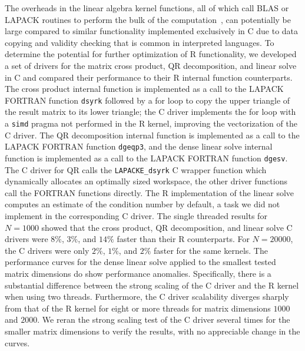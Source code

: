 The overheads in the linear algebra kernel functions, all of which call BLAS or LAPACK
routines to perform the bulk of the computation~\cite{cran:Rmanuals}, can potentially be
large compared to similar functionality implemented exclusively in C due to data copying
and validity checking that is common in interpreted languages. To determine the potential
for further optimization of R functionality, we developed a set of drivers for the matrix
cross product, QR decomposition, and linear solve in C and compared their performance to
their R internal function counterparts. The cross product internal function is
implemented as a call to the LAPACK FORTRAN function \texttt{dsyrk} followed by a for loop
to copy the upper triangle of the result matrix to its lower triangle; the C driver
implements the for loop with a \texttt{simd} pragma not performed in the R kernel, improving
the vectorization of the C driver. The QR decomposition internal function is implemented as a call
to the LAPACK FORTRAN function \texttt{dgeqp3}, and the dense linear solve internal
function is implemented as a call to the LAPACK FORTRAN function \texttt{dgesv}. The C
driver for QR calls the \texttt{LAPACKE\_dsyrk} C wrapper function which dynamically
allocates an optimally sized workspace, the other driver functions call the FORTRAN
functions directly. The R implementation of the linear solve computes an estimate of the
condition number by default, a task we did not implement in the corresponding C driver.
The single threaded results for $N=1000$ showed that the cross product,
QR decomposition, and linear solve C drivers were $8\%$, $3\%$, and $14\%$ faster than their
R counterparts.  For $N=20000$, the C drivers were only $2\%$, $1\%$, and $2\%$ faster for
the same kernels.
The performance curves for the dense linear solve applied to the smallest tested matrix
dimensions do show performance anomalies.  Specifically, there is a substantial difference
between the strong scaling of the C driver and the R kernel when using two threads. Furthermore, the C
driver scalability diverges sharply from that of the R kernel for eight or more threads
for matrix dimensions $1000$ and $2000$. We reran the strong scaling test of the C driver
several times for the smaller matrix dimensions to verify the results, with no appreciable
change in the curves.

